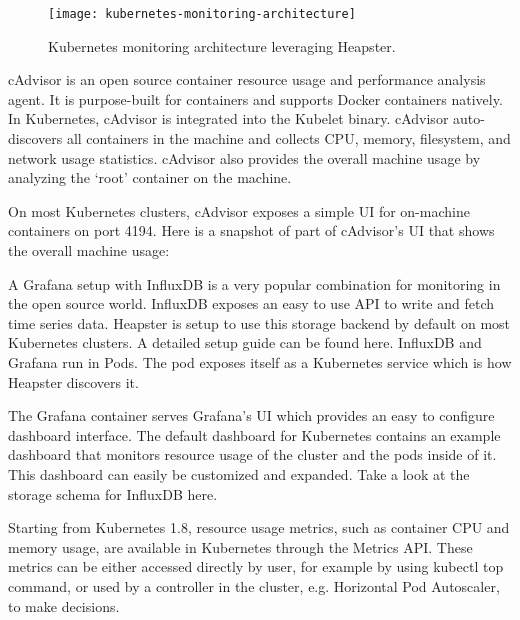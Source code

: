 \begin{figure}	
	\label{fig:kubernetes-monitoring-architecture}
	\centering
	\texttt{[image: kubernetes-monitoring-architecture]}
	\caption{Kubernetes monitoring architecture leveraging Heapster.}
\end{figure}

cAdvisor is an open source container resource usage and performance analysis agent. It is purpose-built for containers and supports Docker containers natively. In Kubernetes, cAdvisor is integrated into the Kubelet binary. cAdvisor auto-discovers all containers in the machine and collects CPU, memory, filesystem, and network usage statistics. cAdvisor also provides the overall machine usage by analyzing the ‘root’ container on the machine.

On most Kubernetes clusters, cAdvisor exposes a simple UI for on-machine containers on port 4194. Here is a snapshot of part of cAdvisor’s UI that shows the overall machine usage:


A Grafana setup with InfluxDB is a very popular combination for monitoring in the open source world. InfluxDB exposes an easy to use API to write and fetch time series data. Heapster is setup to use this storage backend by default on most Kubernetes clusters. A detailed setup guide can be found here. InfluxDB and Grafana run in Pods. The pod exposes itself as a Kubernetes service which is how Heapster discovers it.

The Grafana container serves Grafana’s UI which provides an easy to configure dashboard interface. The default dashboard for Kubernetes contains an example dashboard that monitors resource usage of the cluster and the pods inside of it. This dashboard can easily be customized and expanded. Take a look at the storage schema for InfluxDB here.


Starting from Kubernetes 1.8, resource usage metrics, such as container CPU and memory usage, are available in Kubernetes through the Metrics API. These metrics can be either accessed directly by user, for example by using kubectl top command, or used by a controller in the cluster, e.g. Horizontal Pod Autoscaler, to make decisions.

